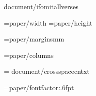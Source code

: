 



{document/ifomitallverses}

\PaperWidth={paper/width}
\PaperHeight={paper/height}

\MarginUnit={paper/margins}mm
\def\TopMarginFactor{{{paper/topmarginfactor}}}
\def\BottomMarginFactor{{{paper/bottommarginfactor}}}

\BodyColumns={paper/columns}
\def\ColumnGutterFactor{{{document/colgutterfactor}}}

\def\LineSpacingFactor{{{paragraph/linespacing}}}
\def\VerticalSpaceFactor{{1.0}}

\XeTeXinterwordspaceshaping = {document/crossspacecntxt}

\FontSizeUnit={paper/fontfactor:.6f}pt   %



